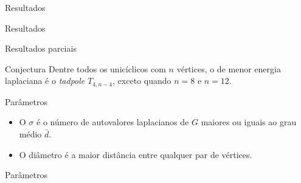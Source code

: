 \documentclass{beamer}
\begin{document}
\begin{frame}{Resultados}
    \begin{table}[h]
        
        \caption{Resultados para grafos unicíclicos onde $4 \leq n \leq 17$.}
    \end{table}
\end{frame}

\begin{frame}{Resultados}
    \begin{table}[h]
        
        \caption{Casos especiais onde o grafo com menor energia não é um \emph{tadpole}.}
    \end{table}
\end{frame}

\begin{frame}{Resultados parciais}
    \begin{table}[h]
        
        \caption{Comparação entre os resultados parciais e os grafos \emph{tadpole}.}
    \end{table}    
\end{frame}

\begin{frame}{Conjectura}
    Dentre todos os unicíclicos com $n$ vértices, o de menor energia laplaciana é o \emph{tadpole} $T_{4,n-4}$, exceto quando $n=8$ e $n=12$.
\end{frame}

\begin{frame}{Parâmetros}
    \begin{itemize}
        \item O \alert{$\sigma$} é o número de autovalores laplacianos de $G$ maiores ou iguais ao grau médio $\bar{d}$. \cite{pinheiro}
        \item O \alert{diâmetro} é a maior distância entre qualquer par de vértices.
    \end{itemize}
\end{frame}

\begin{frame}{Parâmetros}
    \begin{table}[h]
        
        \caption{$\sigma$ e diâmetro para os grafos unicíclicos.}
    \end{table}    
\end{frame}
\end{document}
